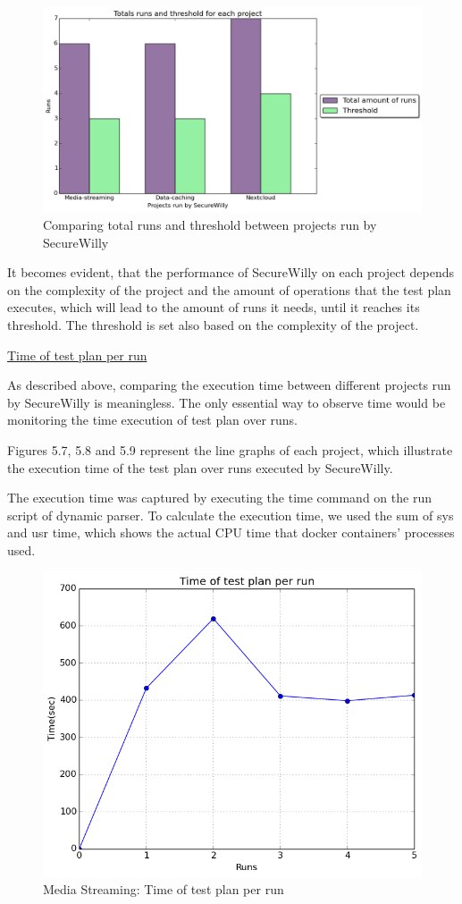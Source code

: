 \begin{figure}[h!]
  \centering
   \includegraphics[width=1\linewidth]{../figures/compare.png}
   \caption{Comparing total runs and threshold between projects run by SecureWilly}
\end{figure}

It becomes evident, that the performance of SecureWilly on each project depends on the complexity of the project and the amount of operations that the test plan executes, which will lead to the amount of runs it needs, until it reaches its threshold. The threshold is set also based on the complexity of the project.

\hfill\break
\underline{Time of test plan per run}
\hfill\break

As described above, comparing the execution time between different projects run by SecureWilly is meaningless. The only essential way to observe time would be monitoring the time execution of test plan over runs.

Figures 5.7, 5.8 and 5.9 represent the line graphs of each project, which illustrate the execution time of the test plan over runs executed by SecureWilly.

The execution time was captured by executing the time command on the run script of dynamic parser. To calculate the execution time, we used the sum of sys and usr time, which shows the actual CPU time that docker containers' processes used.

\begin{figure}[h!]
  \centering
   \includegraphics[width=0.70\linewidth]{../figures/mediastreaming/time.png}
   \caption{Media Streaming: Time of test plan per run}
\end{figure}

